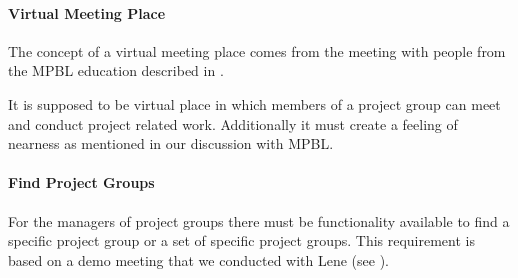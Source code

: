 \paragraph{Virtual Meeting Place}
The concept of a virtual meeting place comes from the meeting with people from the MPBL education described in . 
\begin{comment}
From the interview with Lene in \appref{sec:lene} we know that she manually types a list of groups and their members into Moodle.
In the interview with Jette and Pia (\appref{sec:jettePia}) we learn that a member of the \admpers{} is responsible for the formed groups. 
This implies that there exist records of the composition of the groups.   
In contrast to the these two interviews Morten explains in an interview (\appref{sec:morten}) that on the MPBL education the \admpers{} do not manage the project groups.

Based on this information we decide that we will make a virtual meeting place that reflects the project groups that exist on Aalborg university. 
We decide this knowing that it will cause additional work for the \admpers{} on the MPBL education. 
We will elaborate on the virtual meeting place in \chapref{chap:analdesign}.
\end{comment}
It is supposed to be virtual place in which members of a project group can meet and conduct project related work.
Additionally it must create a feeling of nearness as mentioned in our discussion with MPBL.


\paragraph{Find Project Groups}
\begin{comment}
We deem that it is necessary to create a list with all the project groups that exist.
This should be available to the part of our target group that manage the project groups.
In our third sprint we held a demo meeting where Lene mentioned that it was difficult to find a project group when there were many project groups in the system(see \appref{sec:lenedemoone}).
We decide to make functionality that will allow users to search in the list of project groups.
The implementation of this concrete problem will be addressed in \secref{sec:manProjGrpImpl}.
\end{comment}
For the managers of project groups there must be functionality available to find a specific project group or a set of specific project groups.
This requirement is based on a demo meeting that we conducted with Lene (see ).


